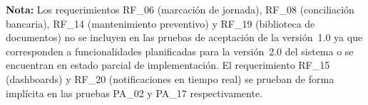\noindent\textbf{Nota:} Los requerimientos RF\_06 (marcación de jornada), RF\_08 (conciliación bancaria), RF\_14 (mantenimiento preventivo) y RF\_19 (biblioteca de documentos) no se incluyen en las pruebas de aceptación de la versión~1.0 ya que corresponden a funcionalidades planificadas para la versión~2.0 del sistema o se encuentran en estado parcial de implementación. El requerimiento RF\_15 (dashboards) y RF\_20 (notificaciones en tiempo real) se prueban de forma implícita en las pruebas PA\_02 y PA\_17 respectivamente.
